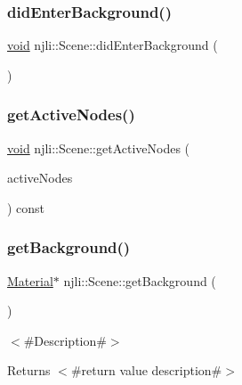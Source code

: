 \subsubsection{\texorpdfstring{did\+Enter\+Background()}{didEnterBackground()}}
{\footnotesize\ttfamily \mbox{\hyperlink{_thread_8h_af1e856da2e658414cb2456cb6f7ebc66}{void}} njli\+::\+Scene\+::did\+Enter\+Background (\begin{DoxyParamCaption}{ }\end{DoxyParamCaption})}

\mbox{\label{classnjli_1_1_scene_aafc49de895ac5cdf65bdd2668b186333}} 
\subsubsection{\texorpdfstring{get\+Active\+Nodes()}{getActiveNodes()}}
{\footnotesize\ttfamily \mbox{\hyperlink{_thread_8h_af1e856da2e658414cb2456cb6f7ebc66}{void}} njli\+::\+Scene\+::get\+Active\+Nodes (\begin{DoxyParamCaption}\item[{bt\+Aligned\+Object\+Array$<$ \mbox{\hyperlink{classnjli_1_1_node}{Node}} $\ast$$>$ \&}]{active\+Nodes }\end{DoxyParamCaption}) const\hspace{0.3cm}{\ttfamily [protected]}}

\mbox{\label{classnjli_1_1_scene_ae2f72caffbca0a65f601ee99827e1c81}} 
\subsubsection{\texorpdfstring{get\+Background()}{getBackground()}\hspace{0.1cm}{\footnotesize\ttfamily [1/2]}}
{\footnotesize\ttfamily \mbox{\hyperlink{classnjli_1_1_material}{Material}}$\ast$ njli\+::\+Scene\+::get\+Background (\begin{DoxyParamCaption}{ }\end{DoxyParamCaption})}

$<$\#\+Description\#$>$

\begin{DoxyReturn}{Returns}
$<$\#return value description\#$>$ 
\end{DoxyReturn}
\mbox{\label{classnjli_1_1_scene_afbd5cc6d18028c8e948b4e4fb72bd891}} 

